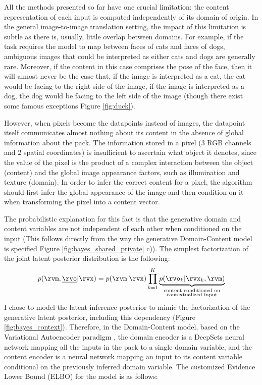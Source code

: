 \documentclass[withindex,glossary,firstyr,times]{cam-thesis}
\begin{document}
All the methods presented so far have one crucial limitation: the content representation of each input is computed independently of its domain of origin. In the general image-to-image translation setting, the impact of this limitation is subtle as there is, usually, little overlap between domains. For example, if the task requires the model to map between faces of cats and faces of dogs, ambiguous images that could be interpreted as either cats and dogs are generally rare. Moreover, if the content in this case comprises the pose of the face, then it will almost never be the case that, if the image is interpreted as a cat, the cat would be facing to the right side of the image, if the image is interpreted as a dog, the dog would be facing to the left side of the image (though there exist some famous exceptions Figure \ref{fig:duck}).

However, when pixels become the datapoints instead of images, the datapoint itself communicates almost nothing about its content in the absence of global information about the pack. The information stored in a pixel (3 RGB channels and 2 spatial coordinates) is insufficient to ascertain what object it denotes, since the value of the pixel is the product of a complex interaction between the object (content) and the global image appearance factors, such as illumination and texture (domain). In order to infer the correct content for a pixel, the algorithm should first infer the global appearance of the image and then condition on it when transforming the pixel into a content vector.

The probabilistic explanation for this fact is that the generative domain and content variables are not independent of each other when conditioned on the input (This follows directly from the way the generative Domain-Content model is specified Figure \ref{fig:bayes_shared_private} c)). The simplest factorization of the joint latent posterior distribution is the following:
\begin{equation}
    p(\rvm, \underline{\rvo} | \rvx) = p(\rvm | \rvx) \prod_{k=1}^K \underbrace{p(\rvo_k | \rvx_k, \rvm)}_{\substack{\text{content conditioned on} \\ \text{contextualized input}}}
\end{equation}
I chose to model the latent inference posterior to mimic the factorization of the generative latent posterior, including this dependency (Figure \ref{fig:bayes_context}). Therefore, in the Domain-Content model, based on the Variational Autoencoder paradigm \cite{kingma2013auto, rezende2014stochastic}, the domain encoder is a DeepSets neural network \cite{zaheer2017deep} mapping all the inputs in the pack to a single domain variable, and the content encoder is a neural network mapping an input to its content variable conditional on the previously inferred domain variable. The customized Evidence Lower Bound (ELBO) for the model is as follows:
\end{document}
